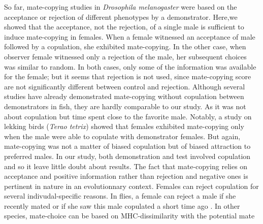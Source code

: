 \documentclass[a4paper, 12pt]{article}
\begin{document}
So far, mate-copying studies in \textit{Drosophila melanogaster} were based on the acceptance or rejection of different phenotypes by a demonstrator.
Here,we showed that the acceptance, not the rejection, of a single male is sufficient to induce mate-copying in females. 
When a female witnessed an acceptance of male followed by a copulation, she exhibited mate-copying. 
In the other case, when observer female witnessed only a rejection of the male, her subsequent choices was similar to random. 
In both cases, only some of the information was available for the female; but it seems that rejection is not used, since mate-copying score are not significantly different between control and rejection. 
Although several studies have already demonstrated mate-copying without copulation between demonstrators in fish, they are hardly comparable to our study. 
As it was not about copulation but time spent close to the favorite male\parencite{dugatkin_lee_alan_reversal_1992,galef_mate-choice_1998}. 
Notably, a study on lekking birds (\textit{Terao tetrix})  showed that females exhibited mate-copying only when the male were able to copulate with demonstrator females. 
But again, mate-copying was not a matter of biased copulation but of biased attraction to preferred males. 
In our study, both demonstration and test involved copulation and so it leave little doubt about results. 
The fact that mate-copying relies on acceptance and positive information rather than rejection and negative ones is pertinent in nature in an evolutionnary context. 
Females can reject copulation for several indivudal-specific reasons. In flies, a female can reject a male if she recently mated \parencite{chapman_sex_2003} or if she saw this male copulated a short time ago \parencite{loyau_when_2012}.
 In other species, mate-choice can be based on MHC-dissimilarity with the potential mate \parencite{landry_c._good_2001, wedekind_claus_mhc-dependent_1995} 
	
	 
 





\clearpage
\newrefcontext[sorting=nyt] %
\printbibliography
 
\end{document}
